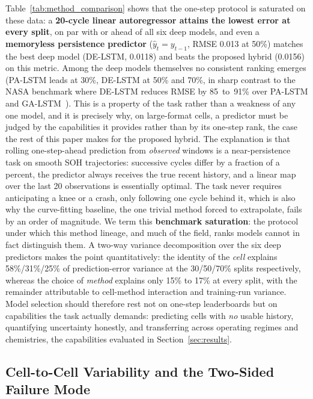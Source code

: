 Table~\ref{tab:method_comparison} shows that the one-step protocol is
saturated on these data: a \textbf{20-cycle linear autoregressor attains the
lowest error at every split}, on par with or ahead of all six deep models, and
even a \textbf{memoryless persistence predictor} ($\hat{y}_t=y_{t-1}$, RMSE
0.013 at 50\%) matches the best deep model (DE-LSTM, 0.0118) and beats the
proposed hybrid (0.0156) on this metric. Among the deep models themselves no
consistent ranking emerges (PA-LSTM leads at
30\%, DE-LSTM at 50\% and 70\%, in sharp contrast to the NASA benchmark where
DE-LSTM reduces RMSE by \mbox{85 to 91\%} over PA-LSTM and
GA-LSTM~\cite{ponnambalam2026delstm}).
This is a property of the task rather than a weakness of any one model, and it
is precisely why, on large-format cells, a predictor must be judged by the
capabilities it provides rather than by its one-step rank, the case the rest of
this paper makes for the proposed hybrid.
The explanation is that rolling one-step-ahead prediction from \emph{observed}
windows is a near-persistence task on smooth SOH trajectories: successive
cycles differ by a fraction of a percent, the predictor always receives the
true recent history, and a linear map over the last 20 observations is
essentially optimal.
The task never requires anticipating a knee or a crash, only following one
cycle behind it, which is also why the curve-fitting baseline, the one
trivial method forced to extrapolate, fails by an order of magnitude.
We term this \textbf{benchmark saturation}: the protocol under which this
method lineage, and much of the field, ranks models cannot in fact
distinguish them.
A two-way variance decomposition over the six deep predictors makes the point
quantitatively: the identity of the \emph{cell} explains 58\%/31\%/25\% of
prediction-error variance at the 30/50/70\% splits respectively, whereas the
choice of \emph{method} explains only 15\% to 17\% at every split, with the
remainder attributable to cell-method interaction and training-run variance.
Model selection should therefore rest not on one-step leaderboards but on
capabilities the task actually demands: predicting cells with \emph{no}
usable history, quantifying uncertainty honestly, and transferring across
operating regimes and chemistries, the capabilities evaluated in
Section~\ref{sec:results}.

\subsection{Cell-to-Cell Variability and the Two-Sided Failure Mode}\label{sec:variability}

